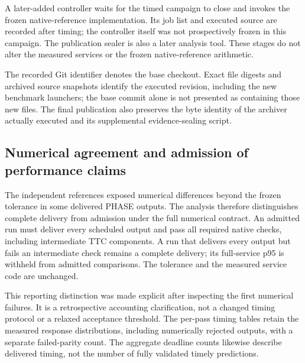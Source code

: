 A later-added controller waits for the timed campaign to close and invokes the frozen native-reference implementation. Its job list and executed source are recorded after timing; the controller itself was not prospectively frozen in this campaign. The publication sealer is also a later analysis tool. These stages do not alter the measured services or the frozen native-reference arithmetic.

The recorded Git identifier denotes the base checkout. Exact file digests and archived source snapshots identify the executed revision, including the new benchmark launchers; the base commit alone is not presented as containing those new files. The final publication also preserves the byte identity of the archiver actually executed and its supplemental evidence-sealing script.

\subsection{Numerical agreement and admission of performance claims}

The independent references exposed numerical differences beyond the frozen tolerance in some delivered PHASE outputs. The analysis therefore distinguishes complete delivery from admission under the full numerical contract. An admitted run must deliver every scheduled output and pass all required native checks, including intermediate TTC components. A run that delivers every output but fails an intermediate check remains a complete delivery; its full-service p95 is withheld from admitted comparisons. The tolerance and the measured service code are unchanged.

This reporting distinction was made explicit after inspecting the first numerical failures. It is a retrospective accounting clarification, not a changed timing protocol or a relaxed acceptance threshold. The per-pass timing tables retain the measured response distributions, including numerically rejected outputs, with a separate failed-parity count. The aggregate deadline counts likewise describe delivered timing, not the number of fully validated timely predictions.



\begin{table}[H]
\centering\footnotesize
\caption{\textbf{PHASE component agreement with native inference.} Checks and failures count repeated delivered comparisons; anchors count distinct failed anchors within each scene, and runs count affected repetitions. Maximum errors use all delivered comparisons. Complete delivery alone does not establish numerical admission.}

\end{table}

